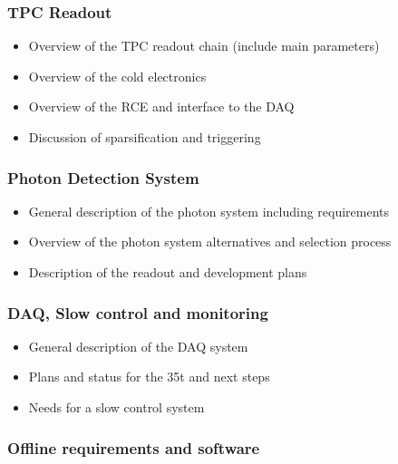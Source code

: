 \subsubsection{TPC Readout}

\begin{itemize}
\item Overview of the TPC readout chain (include main parameters)
\item Overview of the cold electronics
\item Overview of the RCE and interface to the DAQ
\item	Discussion of sparsification and triggering
\end{itemize}

\subsubsection{Photon Detection System}
\begin{itemize}
\item General description of the photon system including requirements
\item Overview of the photon system alternatives and selection process
\item Description of the readout and development plans
\end{itemize}

\subsubsection{DAQ, Slow control and monitoring}
\begin{itemize}
\item General description of the DAQ system
\item Plans and status for the 35t and next steps
\item Needs for a slow control system
\end{itemize}

\subsubsection{Offline requirements and software}



